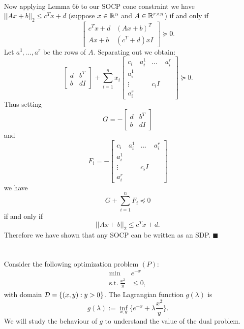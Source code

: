 \documentclass[letterpaper,12pt,oneside,onecolumn]{article}
\begin{document}
\paragraph{}
Now applying Lemma $6b$ to our SOCP cone constraint we have $||Ax +b||_2 \leq c^Tx + d$ (suppose $x\in\mathbb{R}^n$ and $A \in \mathbb{R}^{r\times n}$) if and only if
$$\begin{bmatrix} c^Tx + d & (Ax+b)^T \\ Ax + b &(c^T+d)xI \end{bmatrix} \succcurlyeq 0.$$
Let $a^1, \dots, a^r$ be the rows of $A$. Separating out we obtain:
$$\begin{bmatrix} d & b^T \\ b & dI \end{bmatrix} + \sum_{i=1}^n x_i \begin{bmatrix} c_i & a^1_i & \dots & a^r_i \\ a^1_i \\ \vdots & &c_iI\\ a^r_i \end{bmatrix} \succcurlyeq 0.$$
Thus setting $$G = -\begin{bmatrix} d & b^T \\ b & dI \end{bmatrix}$$
and 
$$F_i = -\begin{bmatrix} c_i & a^1_i & \dots & a^r_i \\ a^1_i \\ \vdots & &c_iI\\ a^r_i \end{bmatrix}$$
we have
$$G + \sum_{i=1}^n F_i \preccurlyeq 0$$
if and only if
$$||Ax+b||_2 \leq c^Tx + d.$$
Therefore we have shown that any SOCP can be written as an SDP. $\blacksquare$

\section{}
\paragraph{}
Consider the following optimization problem $(P)$:
\begin{align*}
\min\ &e^{-x} \\
\text{s.t.}\ \frac{x^2}{y} &\leq 0,
\end{align*}
with domain $\mathcal{D} = \{(x,y) : y > 0 \}$. The Lagrangian function $g(\lambda)$ is
$$ g(\lambda) := \inf_{x,y} \{ e^{-x} + \lambda \frac{x^2}{y}\}.$$
We will study the behaviour of $g$ to understand the value of the dual problem.
\end{document}
